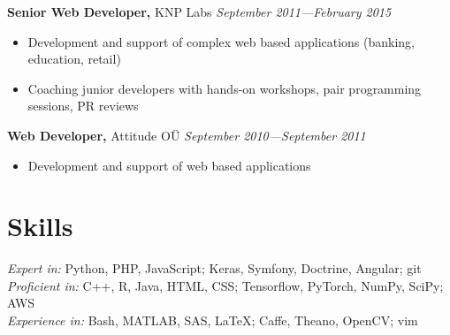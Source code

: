 \documentclass[margin,line]{res}
\begin{document}
\begin{resume}
{\bf Senior Web Developer,} KNP Labs \hfill {\it September 2011---February 2015}\\
\vspace*{-.1in}
\begin{itemize}
\item[ ] Development and support of complex web based applications (banking, education, retail)
\item[ ] Coaching junior developers with hands-on workshops, pair programming sessions, PR reviews 
\end{itemize}
\vspace*{-.05in}
{\bf Web Developer,} Attitude OÜ \hfill {\it September 2010---September 2011}\\
\vspace*{-.1in}
\begin{itemize}
\item[ ] Development and support of web based applications
\end{itemize}


\section{\sc Skills}
{\it Expert in:} Python, PHP, JavaScript; Keras, Symfony, Doctrine, Angular; git
\vspace*{+.01in}\\
{\it Proficient in:} C++, R, Java, HTML, CSS; Tensorflow, PyTorch, NumPy, SciPy; AWS
\vspace*{+.01in}\\
{\it Experience in:} Bash, MATLAB, SAS, LaTeX; Caffe, Theano, OpenCV; vim



\end{resume}
\end{document}

